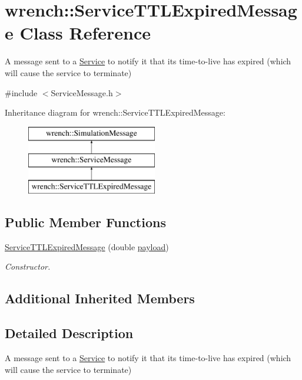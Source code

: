 \hypertarget{classwrench_1_1_service_t_t_l_expired_message}{}\section{wrench\+:\+:Service\+T\+T\+L\+Expired\+Message Class Reference}
\label{classwrench_1_1_service_t_t_l_expired_message}


A message sent to a \hyperlink{classwrench_1_1_service}{Service} to notify it that its time-\/to-\/live has expired (which will cause the service to terminate)  




{\ttfamily \#include $<$Service\+Message.\+h$>$}

Inheritance diagram for wrench\+:\+:Service\+T\+T\+L\+Expired\+Message\+:\begin{figure}[H]
\begin{center}
\leavevmode
\includegraphics[height=3.000000cm]{classwrench_1_1_service_t_t_l_expired_message}
\end{center}
\end{figure}
\subsection*{Public Member Functions}
\begin{DoxyCompactItemize}
\item 
\hyperlink{classwrench_1_1_service_t_t_l_expired_message_a065b4c81b01a865e9944efb69769e785}{Service\+T\+T\+L\+Expired\+Message} (double \hyperlink{classwrench_1_1_simulation_message_a914f2732713f7c02898e66f05a7cb8a1}{payload})
\begin{DoxyCompactList}\small\item\em Constructor. \end{DoxyCompactList}\end{DoxyCompactItemize}
\subsection*{Additional Inherited Members}


\subsection{Detailed Description}
A message sent to a \hyperlink{classwrench_1_1_service}{Service} to notify it that its time-\/to-\/live has expired (which will cause the service to terminate) 

